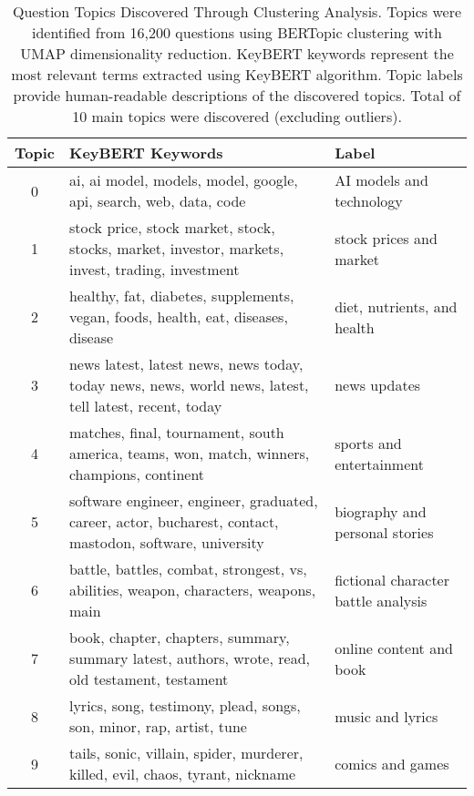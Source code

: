 \begin{table}[htbp]
\centering
\caption{Question Topics Discovered Through Clustering Analysis. Topics were identified from 16,200 questions using BERTopic clustering with UMAP dimensionality reduction. KeyBERT keywords represent the most relevant terms extracted using KeyBERT algorithm. Topic labels provide human-readable descriptions of the discovered topics. Total of 10 main topics were discovered (excluding outliers).}
\label{tab:question_topics}
\begin{tabular}{cp{5cm}p{7cm}}
\toprule
Topic & KeyBERT Keywords & Label \\
\midrule
0 & ai, ai model, models, model, google, api, search, web, data, code & AI models and technology \\
1 & stock price, stock market, stock, stocks, market, investor, markets, invest, trading, investment & stock prices and market \\
2 & healthy, fat, diabetes, supplements, vegan, foods, health, eat, diseases, disease & diet, nutrients, and health \\
3 & news latest, latest news, news today, today news, news, world news, latest, tell latest, recent, today & news updates \\
4 & matches, final, tournament, south america, teams, won, match, winners, champions, continent & sports and entertainment \\
5 & software engineer, engineer, graduated, career, actor, bucharest, contact, mastodon, software, university & biography and personal stories \\
6 & battle, battles, combat, strongest, vs, abilities, weapon, characters, weapons, main & fictional character battle analysis \\
7 & book, chapter, chapters, summary, summary latest, authors, wrote, read, old testament, testament & online content and book \\
8 & lyrics, song, testimony, plead, songs, son, minor, rap, artist, tune & music and lyrics \\
9 & tails, sonic, villain, spider, murderer, killed, evil, chaos, tyrant, nickname & comics and games \\
\bottomrule
\end{tabular}
\end{table}